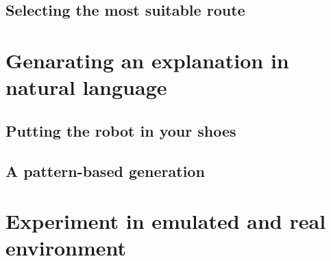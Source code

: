 \subsection{Selecting the most suitable route}

\section{Genarating an explanation in natural language}

\subsection{Putting the robot in your shoes}

\subsection{A pattern-based generation}

\section{Experiment in emulated and real environment}



